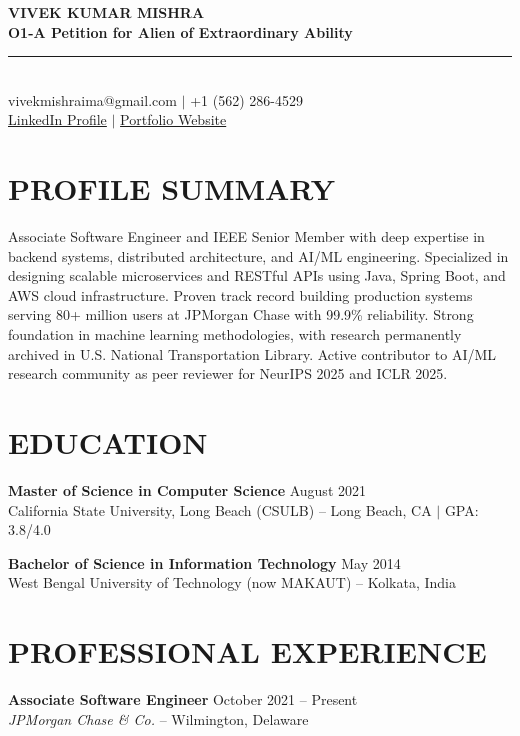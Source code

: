 \documentclass[11pt,letterpaper]{article}
\begin{document}
\begin{center}
    {\LARGE \textbf{VIVEK KUMAR MISHRA}}\\[4pt]
    \textbf{O1-A Petition for Alien of Extraordinary Ability}\\[8pt]
    \rule{\textwidth}{0.5pt}\\[4pt]
    vivekmishraima@gmail.com $\mid$ +1 (562) 286-4529\\
    \href{https://www.linkedin.com/in/vivek-mishra-5a93b568/}{LinkedIn Profile} $\mid$ \href{https://vivekmishra02.github.io/}{Portfolio Website}
\end{center}

\section*{PROFILE SUMMARY}

Associate Software Engineer and IEEE Senior Member with deep expertise in backend systems, distributed architecture, and AI/ML engineering. Specialized in designing scalable microservices and RESTful APIs using Java, Spring Boot, and AWS cloud infrastructure. Proven track record building production systems serving 80+ million users at JPMorgan Chase with 99.9\% reliability. Strong foundation in machine learning methodologies, with research permanently archived in U.S. National Transportation Library. Active contributor to AI/ML research community as peer reviewer for NeurIPS 2025 and ICLR 2025.

\section*{EDUCATION}

\textbf{Master of Science in Computer Science} \hfill August 2021\\
California State University, Long Beach (CSULB) -- Long Beach, CA $\mid$ GPA: 3.8/4.0

\textbf{Bachelor of Science in Information Technology} \hfill May 2014\\
West Bengal University of Technology (now MAKAUT) -- Kolkata, India

\section*{PROFESSIONAL EXPERIENCE}

\textbf{Associate Software Engineer} \hfill October 2021 -- Present\\
\textit{JPMorgan Chase \& Co.} -- Wilmington, Delaware
\end{document}

